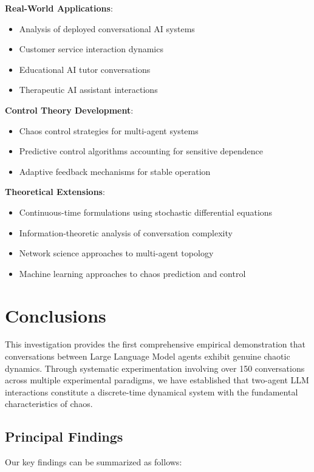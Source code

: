 \documentclass[11pt,a4paper]{article}
\begin{document}
\textbf{Real-World Applications}:
\begin{itemize}
    \item Analysis of deployed conversational AI systems
    \item Customer service interaction dynamics
    \item Educational AI tutor conversations
    \item Therapeutic AI assistant interactions
\end{itemize}

\textbf{Control Theory Development}:
\begin{itemize}
    \item Chaos control strategies for multi-agent systems
    \item Predictive control algorithms accounting for sensitive dependence
    \item Adaptive feedback mechanisms for stable operation
\end{itemize}

\textbf{Theoretical Extensions}:
\begin{itemize}
    \item Continuous-time formulations using stochastic differential equations
    \item Information-theoretic analysis of conversation complexity
    \item Network science approaches to multi-agent topology
    \item Machine learning approaches to chaos prediction and control
\end{itemize}

\section{Conclusions}

This investigation provides the first comprehensive empirical demonstration that conversations between Large Language Model agents exhibit genuine chaotic dynamics. Through systematic experimentation involving over 150 conversations across multiple experimental paradigms, we have established that two-agent LLM interactions constitute a discrete-time dynamical system with the fundamental characteristics of chaos.

\subsection{Principal Findings}

Our key findings can be summarized as follows:
\end{document}
